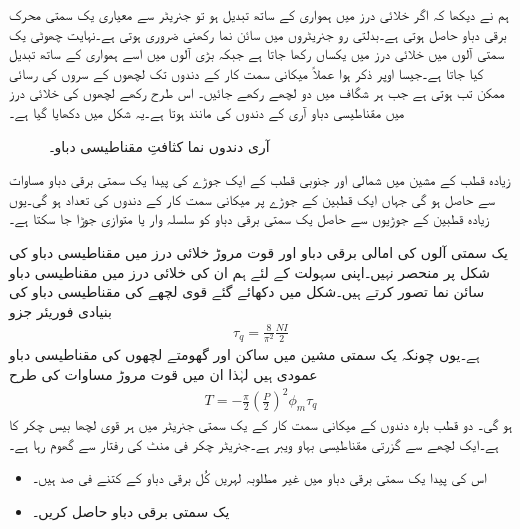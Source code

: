 ہم نے دیکھا کہ اگر خلائی درز میں  ہمواری کے ساتھ تبدیل ہو تو جنریٹر سے معیاری یک سمتی محرک برقی دباو حاصل ہوتی ہے۔بدلتی رو جنریٹروں میں  سائن نما رکھنی ضروری ہوتی ہے۔نہایت چھوٹی یک سمتی آلوں میں خلائی درز میں   یکساں رکھا جاتا ہے جبکہ بڑی آلوں میں اسے ہمواری کے ساتھ تبدیل کیا جاتا ہے۔جیسا اوپر ذکر ہوا عملاً میکانی سمت کار کے دندوں تک لچھوں کے سروں کی رسائی ممکن تب ہوتی ہے جب ہر شگاف میں دو لچھے رکھے جائیں۔ اس طرح رکھے لچھوں کی خلائی درز میں مقناطیسی دباو آری کے دندوں کی مانند ہوتا ہے۔یہ شکل   میں دکھایا گیا ہے۔
\begin{figure}
\centering
\caption{آری دندوں نما کثافتِ مقناطیسی دباو۔}
\label{شکل_یکسمتی_آری_دندوں_نما_دباو}
\end{figure}

زیادہ قطب کے مشین میں شمالی اور جنوبی قطب کے ایک جوڑے کی پیدا یک سمتی برقی دباو مساوات   سے حاصل ہو گی جہاں  ایک قطبین کے جوڑے پر میکانی سمت کار کے دندوں کی تعداد ہو گی۔یوں زیادہ قطبین کے جوڑیوں سے حاصل یک سمتی برقی دباو کو سلسلہ وار یا متوازی جوڑا جا سکتا ہے۔

یک سمتی آلوں کی امالی برقی دباو اور قوت مروڑ خلائی درز میں مقناطیسی دباو کی شکل پر منحصر نہیں۔اپنی سہولت کے لئے ہم ان کی خلائی درز میں مقناطیسی دباو سائن نما تصور کرتے ہیں۔شکل   میں دکھائے گئے قوی لچھے کی مقناطیسی دباو کی بنیادی فوریئر جزو
\begin{align}
\tau_q=\frac{8}{\pi^2} \frac{N I}{2}
\end{align}
ہے۔یوں چونکہ یک سمتی مشین میں ساکن اور گھومتے لچھوں کی مقناطیسی دباو عمودی ہیں لہٰذا ان میں قوت مروڑ مساوات   کی طرح
\begin{align}\label{مساوات_یکسمتی_مروڑ}
T=-\frac{\pi}{2}\left( \frac{P}{2}\right)^2 \phi_m \tau_q 
\end{align} 
ہو گی۔
%
دو قطب بارہ دندوں کے میکانی سمت کار کے یک سمتی جنریٹر میں ہر قوی لچھا بیس چکر کا ہے۔ایک لچھے سے گزرتی مقناطیسی بہاو   ویبر ہے۔جنریٹر  چکر فی منٹ کی رفتار سے گھوم رہا ہے۔
\begin{itemize}
\item
اس کی پیدا یک سمتی برقی دباو میں غیر مطلوبہ لہریں کُل برقی دباو کے کتنے فی صد ہیں۔
\item
یک سمتی برقی دباو حاصل کریں۔
\end{itemize}

